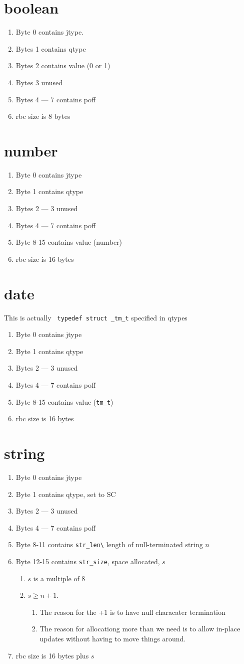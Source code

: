 \documentclass[letterpaper,12pt]{article}
\newcommand{\be}{\begin{enumerate}}
\newcommand{\ee}{\end{enumerate}}
\begin{document}
\section{boolean}
\be
\item Byte 0  contains jtype.
\item Bytes 1 contains qtype
\item Bytes 2 contains value (0 or 1)
\item Bytes 3  unused
\item Bytes 4 --- 7  contains poff
\item rbc size is 8 bytes 
  \ee

\section{number}
\be
\item Byte 0 contains jtype
\item Byte 1 contains qtype
\item Bytes 2 --- 3  unused
\item Bytes 4 --- 7  contains poff
\item Byte 8-15 contains value (number)
\item rbc size is 16 bytes 
  \ee
\section{date}
This is actually \verb+ typedef struct _tm_t+ specified in qtypes
\be
\item Byte 0 contains jtype
\item Byte 1 contains qtype
\item Bytes 2 --- 3  unused
\item Bytes 4 --- 7  contains poff
\item Byte 8-15 contains value (\verb+tm_t+)
\item rbc size is 16 bytes 
  \ee
\section{string}
\be
\item Byte 0 contains jtype
\item Byte 1 contains qtype, set to SC
\item Bytes 2 --- 3  unused
\item Bytes 4 --- 7  contains poff
\item Byte 8-11 contains \verb+str_len\+ length of null-terminated string \(n\)
\item Byte 12-15 contains \verb+str_size+, space allocated, \(s\)
  \be
\item \(s\) is a multiple of 8
\item \(s \geq n+1\). 
  \be
\item The reason for the +1 is to have null characater termination
\item The reason for allocationg more than we 
need is to allow in-place updates without having to move things around.
\ee
\ee
\item rbc size is 16 bytes plus \(s\)
  \ee
\end{document}

